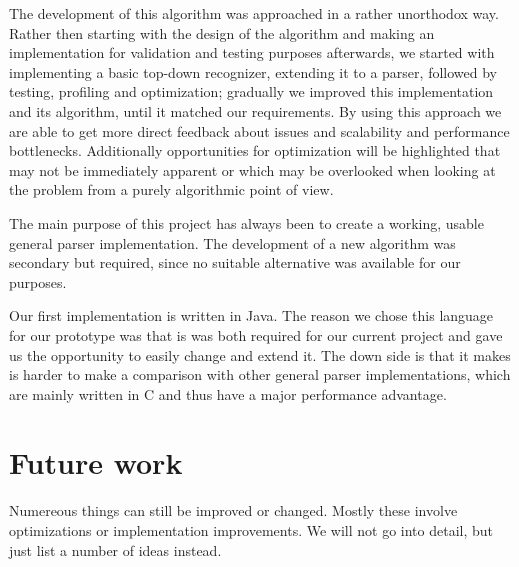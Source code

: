\documentclass[a4paper,10pt]{article}
\begin{document}
The development of this algorithm was approached in a rather unorthodox way. Rather then starting with the design of the algorithm and making an implementation for validation and testing purposes afterwards, we started with implementing a basic top-down recognizer, extending it to a parser, followed by testing, profiling and optimization; gradually we improved this implementation and its algorithm, until it matched our requirements. By using this approach we are able to get more direct feedback about issues and scalability and performance bottlenecks. Additionally opportunities for optimization will be highlighted that may not be immediately apparent or which may be overlooked when looking at the problem from a purely algorithmic point of view.

The main purpose of this project has always been to create a working, usable general parser implementation. The development of a new algorithm was secondary but required, since no suitable alternative was available for our purposes.

Our first implementation is written in Java. The reason we chose this language for our prototype was that is was both required for our current project and gave us the opportunity to easily change and extend it. The down side is that it makes is harder to make a comparison with other general parser implementations, which are mainly written in C and thus have a major performance advantage.

\section{Future work}

Numereous things can still be improved or changed. Mostly these involve optimizations or implementation improvements. We will not go into detail, but just list a number of ideas instead.
\end{document}
